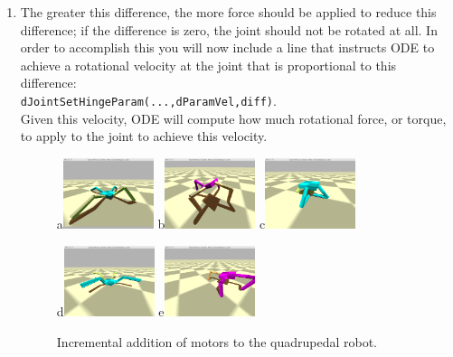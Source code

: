 \documentclass[12pt]{article}
\begin{document}
\begin{enumerate}
\item The greater this difference, the more force should be applied to reduce this difference; if the difference is zero, the joint should not be rotated at all. In order to accomplish this you will now include a line that instructs ODE to achieve a rotational velocity at the joint that is proportional to this difference: \\
    \texttt{dJointSetHingeParam(...,dParamVel,diff)}. \\
    Given this velocity, ODE will compute how much rotational force, or torque, to apply to the joint to achieve this velocity.

\begin{figure}[!t]
\centerline{
a\includegraphics[width=0.25\textwidth]{Fig1a}
b\includegraphics[width=0.25\textwidth]{Fig1b}
c\includegraphics[width=0.25\textwidth]{Fig1c}}
\centerline{
d\includegraphics[width=0.25\textwidth]{Fig1d}
e\includegraphics[width=0.25\textwidth]{Fig1e}}
\caption{Incremental addition of motors to the quadrupedal robot.}
\label{Fig1}
\end{figure}


\end{enumerate}
\end{document}
